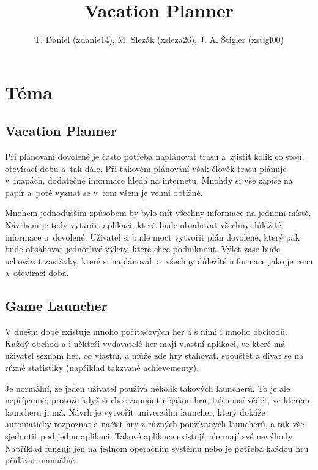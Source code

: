 \documentclass{article}
\title{Vacation Planner}
\author{
    T. Daniel (xdanie14),
    M. Slezák (xsleza26),
    J. A. Štigler (xstigl00)
}
\begin{document}
\maketitle

\newpage

\section{Téma}

\subsection{Vacation Planner}
Při plánování dovolené je často potřeba naplánovat trasu a~zjistit kolik co
stojí, otevírací dobu a~tak dále. Při takovém plánování však člověk trasu
plánuje v~mapách, dodatečné informace hledá na internetu. Mnohdy si vše zapíše
na papír a~poté vyznat se v~tom všem je velmi obtížné.

Mnohem jednodušším způsobem by bylo mít všechny informace na jednom místě.
Návrhem je tedy vytvořit aplikaci, která bude obsahovat všechny důležité
informace o~dovolené. Uživatel si bude moct vytvořit plán dovolené, který
pak bude obsahovat jednotlivé výlety, které chce podniknout. Výlet zase bude
uchovávat zastávky, které si naplánoval, a~všechny důležíté informace jako je
cena a~otevírací doba.

\subsection{Game Launcher}
V dnešní době existuje mnoho počítačových her a s nimi i mnoho obchodů.
Každý obchod a i někteří vydavatelé her mají vlastní aplikaci, ve které má
uživatel seznam her, co vlastní, a může zde hry stahovat, spouštět a dívat se
na různé statistiky (například takzvané achievementy).

Je normální, že jeden uživatel používá několik takových launcherů. To je ale
nepříjemné, protože když si chce zapnout nějakou hru, tak musí vědět, ve kterém
launcheru ji má. Návrh je vytvořit univerzální launcher, který dokáže
automaticky rozpoznat a načíst hry z různých používaných launcherů, a tak vše
sjednotit pod jednu aplikaci. Takové aplikace existují, ale mají své nevýhody.
Například fungují jen na jednom operačním systému nebo je potřeba každou hru
přidávat manuálně.
\end{document}

